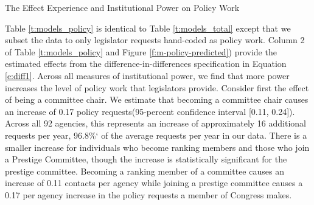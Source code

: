 \begin{table}[hbt!]
\caption{The Effect Experience and Institutional Power on Policy Work} \label{t:models_policy}
\begin{minipage}{\textwidth}
\begin{center}
\small
\end{center}
\end{minipage}
\end{table}


Table \ref{t:models_policy} is identical to Table \ref{t:models_total} except that we subset the data to only legislator requests hand-coded as policy work. 
Column 2 of Table \ref{t:models_policy} and Figure \ref{f:m-policy-predicted}) provide the estimated effects from the difference-in-differences specification in Equation \ref{e:diff1}. Across all measures of institutional power, we find that more power increases the level of policy work that legislators provide. Consider first the effect of being a committee chair. We estimate that becoming a committee chair causes an increase of 0.17  policy requests(95-percent confidence interval [0.11, 0.24]). Across all 92 agencies, this represents an increase of approximately 16 additional requests per year, 96.8\%` of the average requests per year in our data. There is a smaller increase for individuals who become ranking members and those who join a Prestige Committee, though the increase is statistically significant for the prestige committee. Becoming a ranking member of a committee causes an increase of 0.11 contacts per agency while joining a prestige committee causes a 0.17 per agency increase in the policy requests a member of Congress makes.

